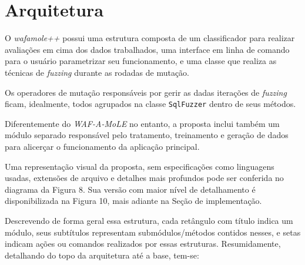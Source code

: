 \section{Arquitetura}

O \textit{wafamole++} possui uma estrutura composta de um classificador para realizar avaliações em cima dos dados trabalhados, uma interface em linha de comando para o usuário parametrizar seu funcionamento, e uma classe que realiza as técnicas de \textit{fuzzing} durante as rodadas de mutação.

Os operadores de mutação responsáveis por gerir as dadas iterações de \textit{fuzzing} ficam, idealmente, todos agrupados na classe \verb+SqlFuzzer+ dentro de seus métodos.

Diferentemente do \textit{WAF-A-MoLE} no entanto, a proposta inclui também um módulo separado responsável pelo tratamento, treinamento e geração de dados para alicerçar o funcionamento da aplicação principal. 

Uma representação visual da proposta, sem especificações como linguagens usadas, extensões de arquivo e detalhes mais profundos pode ser conferida no diagrama da Figura 8. Sua versão com maior nível de detalhamento é disponibilizada na Figura 10, mais adiante na Seção de implementação.

Descrevendo de forma geral essa estrutura, cada retângulo com título indica um módulo, seus subtítulos representam submódulos/métodos contidos nesses, e setas indicam ações ou comandos realizados por essas estruturas. Resumidamente, detalhando do topo da arquitetura até a base, tem-se:

